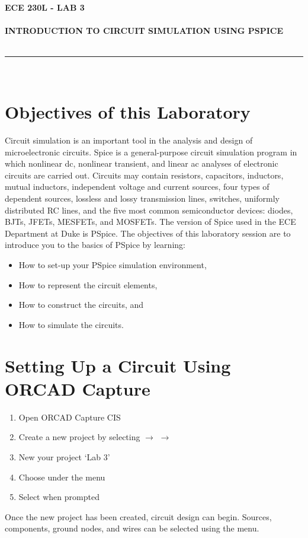 \documentclass[12pt]{../manual}
\begin{document}
\begin{center}
\textbf{\huge ECE 230L - LAB 3}\\~\\
\textbf{\large INTRODUCTION TO CIRCUIT SIMULATION USING PSPICE}\\~\\
\rule{6.5in}{0.5mm}\\
\end{center}

\tableofcontents

\listoffigures

\newpage
%
\section{Objectives of this Laboratory}
Circuit simulation is an important tool in the analysis and design of microelectronic circuits. Spice is a general-purpose circuit simulation program in which nonlinear dc, nonlinear transient, and linear ac analyses of electronic circuits are carried out. Circuits may contain resistors, capacitors, inductors, mutual inductors, independent voltage and current sources, four types of dependent sources, lossless and lossy transmission lines, switches, uniformly distributed RC lines, and the five most common semiconductor devices: diodes, BJTs, JFETs, MESFETs, and MOSFETs. The version of Spice used in the ECE Department at Duke is PSpice. The objectives of this laboratory session are to introduce you to the basics of PSpice by learning:
\begin{itemize}
\item How to set-up your PSpice simulation environment,
\item How to represent the circuit elements,
\item How to construct the circuits, and
\item How to simulate the circuits.
\end{itemize}

\section{Setting Up a Circuit Using ORCAD Capture}
\begin{enumerate}
\item Open ORCAD Capture CIS
\item Create a new project by selecting  $\to$  $\to$ 
\item New your project `Lab 3'
\item Choose  under the  menu
\item Select  when prompted
\end{enumerate}
Once the new project has been created, circuit design can begin. Sources, components, ground nodes, and wires can be selected using the  menu.
\end{document}

